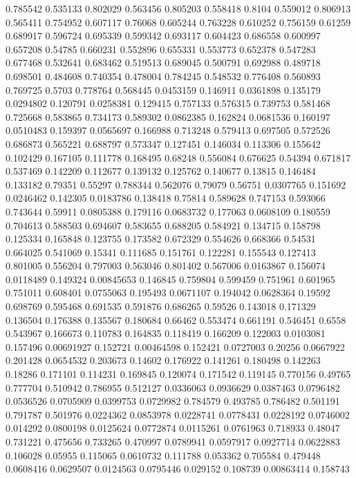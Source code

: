 0.785542 0.535133
0.802029 0.563456
0.805203 0.558418
0.8104 0.559012
0.806913 0.565411
0.754952 0.607117
0.76068 0.605244
0.763228 0.610252
0.756159 0.61259
0.689917 0.596724
0.695339 0.599342
0.693117 0.604423
0.686558 0.600997
0.657208 0.54785
0.660231 0.552896
0.655331 0.553773
0.652378 0.547283
0.677468 0.532641
0.683462 0.519513
0.689045 0.500791
0.692988 0.489718
0.698501 0.484608
0.740354 0.478004
0.784245 0.548532
0.776408 0.560893
0.769725 0.5703
0.778764 0.568445
0.0453159 0.146911
0.0361898 0.135179
0.0294802 0.120791
0.0258381 0.129415
0.757133 0.576315
0.739753 0.581468
0.725668 0.583865
0.734173 0.589302
0.0862385 0.162824
0.0681536 0.160197
0.0510483 0.159397
0.0565697 0.166988
0.713248 0.579413
0.697505 0.572526
0.686873 0.565221
0.688797 0.573347
0.127451 0.146034
0.113306 0.155642
0.102429 0.167105
0.111778 0.168495
0.68248 0.556084
0.676625 0.54394
0.671817 0.537469
0.142209 0.112677
0.139132 0.125762
0.140677 0.13815
0.146484 0.133182
0.79351 0.55297
0.788344 0.562076
0.79079 0.56751
0.0307765 0.151692
0.0246462 0.142305
0.0183786 0.138418
0.75814 0.589628
0.747153 0.593066
0.743644 0.59911
0.0805388 0.179116
0.0683732 0.177063
0.0608109 0.180559
0.704613 0.588503
0.694607 0.583655
0.688205 0.584921
0.134715 0.158798
0.125334 0.165848
0.123755 0.173582
0.672329 0.554626
0.668366 0.54531
0.664025 0.541069
0.15341 0.111685
0.151761 0.122281
0.155543 0.127413
0.801005 0.556204
0.797003 0.563046
0.801402 0.567006
0.0163867 0.156074
0.0118489 0.149324
0.00845653 0.146845
0.759804 0.599459
0.751961 0.601965
0.751011 0.608401
0.0755063 0.195493
0.0671107 0.194042
0.0628364 0.19592
0.698769 0.595468
0.691535 0.591876
0.686265 0.59526
0.143018 0.171329
0.136504 0.176388
0.135567 0.180684
0.66462 0.553474
0.661191 0.546451
0.6558 0.543967
0.166673 0.110783
0.164835 0.118419
0.166209 0.122003
0.0103081 0.157496
0.00691927 0.152721
0.00464598 0.152421
0.0727003 0.20256
0.0667922 0.201428
0.0654532 0.203673
0.14602 0.176922
0.141261 0.180498
0.142263 0.18286
0.171101 0.114231
0.169845 0.120074
0.171542 0.119145
0.770156 0.49765
0.777704 0.510942
0.786955 0.512127
0.0336063 0.0936629
0.0387463 0.0796482
0.0536526 0.0705909
0.0399753 0.0729982
0.784579 0.493785
0.786482 0.501191
0.791787 0.501976
0.0224362 0.0853978
0.0228741 0.0778431
0.0228192 0.0746002
0.014292 0.0800198
0.0125624 0.0772874
0.0115261 0.0761963
0.718933 0.48047
0.731221 0.475656
0.733265 0.470997
0.0789941 0.0597917
0.0927714 0.0622883
0.106028 0.05955
0.115065 0.0610732
0.111788 0.053362
0.705584 0.479448
0.0608416 0.0629507
0.0124563 0.0795446
0.029152 0.108739
0.00863414 0.158743
